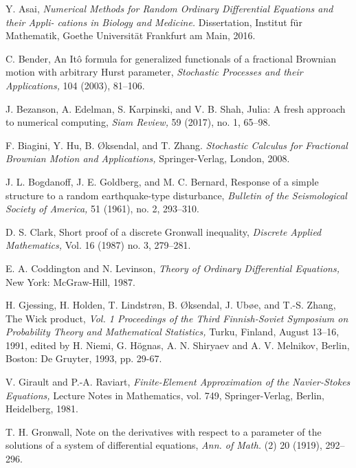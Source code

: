 \documentclass[reqno,12pt]{amsart}
\theoremstyle{plain}%
\theoremstyle{definition}
\begin{document}
\begin{thebibliography}{25}
     Y. Asai, \emph{Numerical Methods for Random Ordinary Differential Equations and their Appli-
    cations in Biology and Medicine.} Dissertation, Institut f\"ur Mathematik, Goethe Universit\"at Frankfurt am Main, 2016. 

     C. Bender, An It\^o formula for generalized functionals of a fractional Brownian motion with arbitrary Hurst parameter, \emph{Stochastic Processes and their Applications,} 104 (2003), 81--106.

     J. Bezanson, A. Edelman, S. Karpinski, and V. B. Shah, Julia: A fresh approach to numerical computing, \emph{Siam Review,} 59 (2017), no. 1, 65--98.

     F. Biagini, Y. Hu, B. {\O}ksendal, and T. Zhang. \emph{Stochastic Calculus for Fractional Brownian Motion and Applications,} Springer-Verlag, London, 2008.

     J. L. Bogdanoff, J. E. Goldberg, and M. C. Bernard, Response of a simple structure to a random earthquake-type disturbance, \emph{Bulletin of the Seismological Society of America,} 51 (1961), no. 2, 293--310.

     D. S. Clark, Short proof of a discrete Gronwall inequality, \emph{Discrete Applied Mathematics,} Vol. 16 (1987) no. 3, 279--281.

     E. A. Coddington and N. Levinson, \emph{Theory of Ordinary Differential Equations,} New York: McGraw-Hill, 1987.

     H. Gjessing, H. Holden, T. Lindstr{\o}n, B. {\O}ksendal, J. Ub{\o}e, and T.-S. Zhang, The Wick product, \emph{Vol. 1 Proceedings of the Third Finnish-Soviet Symposium on Probability Theory and Mathematical Statistics,} Turku, Finland, August 13--16, 1991, edited by H. Niemi, G. H\"ognas, A. N. Shiryaev and A. V. Melnikov, Berlin, Boston: De Gruyter, 1993, pp. 29-67.

     V. Girault and P.-A. Raviart, \emph{Finite-Element Approximation of the Navier-Stokes Equations,} Lecture Notes in Mathematics, vol. 749, Springer-Verlag, Berlin, Heidelberg, 1981.

     T. H. Gronwall, Note on the derivatives with respect to a parameter of the solutions of a system of differential equations, \emph{Ann. of Math.} (2) 20 (1919), 292--296.


\end{thebibliography}
\end{document}
